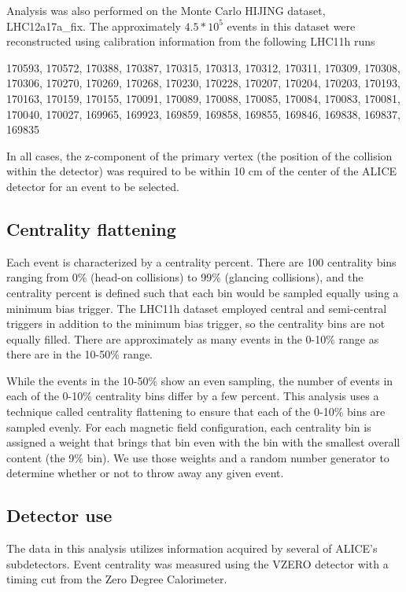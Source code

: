 Analysis was also performed on the Monte Carlo HIJING dataset, LHC12a17a\_fix.
The approximately $4.5*10^5$ events in this dataset were reconstructed using calibration information from the following LHC11h runs

170593, 170572, 170388, 170387, 170315, 170313, 170312, 170311, 170309, 170308, 170306, 170270, 170269, 170268, 170230, 170228, 170207, 170204, 170203, 170193, 170163, 170159, 170155, 170091, 170089, 170088, 170085, 170084, 170083, 170081, 170040, 170027, 169965, 169923, 169859, 169858, 169855, 169846, 169838, 169837, 169835

In all cases, the z-component of the primary vertex (the position of the collision within the detector) was required to be within 10 cm of the center of the ALICE detector for an event to be selected.  

\subsection{Centrality flattening}
\label{sec:CentralityFlattening}

Each event is characterized by a centrality percent.
There are 100 centrality bins ranging from 0\%  (head-on collisions) to 99\% (glancing collisions), and the centrality percent is defined such that each bin would be sampled equally using a minimum bias trigger.
The LHC11h dataset employed central and semi-central triggers in addition to the minimum bias trigger, so the centrality bins are not equally filled.
There are approximately as many events in the 0-10\% range as there are in the 10-50\% range.

While the events in the 10-50\% show an even sampling, the number of events in each of the 0-10\% centrality bins differ by a few percent.
This analysis uses a technique called centrality flattening to ensure that each of the 0-10\% bins are sampled evenly.
For each magnetic field configuration, each centrality bin is assigned a weight that brings that bin even with the bin with the smallest overall content (the 9\% bin).
We use those weights and a random number generator to determine whether or not to throw away any given event.

\subsection{Detector use}
The data in this analysis utilizes information acquired by several of ALICE's subdetectors.  
Event centrality was measured using the VZERO detector with a timing cut from the Zero Degree Calorimeter. 

